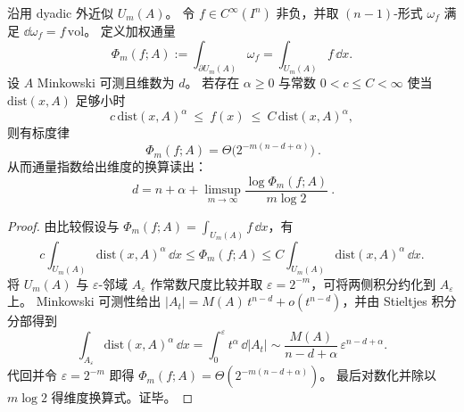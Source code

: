 \begin{proposition}\label{prop:spg-weighted-stokes-flux-vanishing-dimension-shift}
沿用 dyadic 外近似 \(U_m(A)\)。
令 \(f\in C^\infty(I^n)\) 非负，并取 \((n{-}1)\)-形式 \(\omega_f\) 满足
\(
\dd\omega_f=f\,\mathrm{vol}
\)。
定义加权通量
\[
\Phi_m(f;A):=\int_{\partial U_m(A)}\omega_f=\int_{U_m(A)}f\,\dd x.
\]
设 \(A\) Minkowski 可测且维数为 \(d\)。
若存在 \(\alpha\ge 0\) 与常数 \(0<c\le C<\infty\) 使当 \(\mathrm{dist}(x,A)\) 足够小时
\[
c\,\mathrm{dist}(x,A)^{\alpha}\ \le\ f(x)\ \le\ C\,\mathrm{dist}(x,A)^{\alpha},
\]
则有标度律
\[
\boxed{\ \Phi_m(f;A)=\Theta\!\bigl(2^{-m(n-d+\alpha)}\bigr)\ }.
\]
从而通量指数给出维度的换算读出：
\[
\boxed{\ d=n+\alpha+\limsup_{m\to\infty}\frac{\log \Phi_m(f;A)}{m\log 2}\ }.
\]
\end{proposition}
\begin{proof}
由比较假设与 \(\Phi_m(f;A)=\int_{U_m(A)}f\,\dd x\)，有
\[
c\int_{U_m(A)}\mathrm{dist}(x,A)^\alpha\,\dd x
\le \Phi_m(f;A)
\le C\int_{U_m(A)}\mathrm{dist}(x,A)^\alpha\,\dd x.
\]
将 \(U_m(A)\) 与 \(\varepsilon\)-邻域 \(A_\varepsilon\) 作常数尺度比较并取 \(\varepsilon=2^{-m}\)，可将两侧积分约化到 \(A_\varepsilon\) 上。
Minkowski 可测性给出 \(|A_t|=M(A)\,t^{n-d}+o(t^{n-d})\)，并由 Stieltjes 积分分部得到
\[
\int_{A_\varepsilon}\mathrm{dist}(x,A)^\alpha\,\dd x
=\int_{0}^{\varepsilon} t^\alpha\,\dd |A_t|
\sim \frac{M(A)}{n-d+\alpha}\,\varepsilon^{n-d+\alpha}.
\]
代回并令 \(\varepsilon=2^{-m}\) 即得 \(\Phi_m(f;A)=\Theta(2^{-m(n-d+\alpha)})\)。
最后对数化并除以 \(m\log 2\) 得维度换算式。证毕。
\end{proof}
